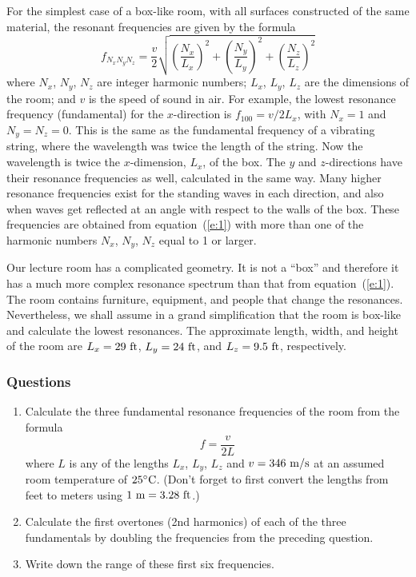 \documentclass[11pt]{NSF}
\def\be{\begin{equation}}
\def\ee{\end{equation}}
\def\ben{\begin{enumerate}}
\def\een{\end{enumerate}}
\begin{document}
For the simplest case of a box-like room, with all surfaces constructed 
of the same material, the resonant frequencies are given by the formula
%
\be
f_{N_xN_yN_z} = \frac{v}{2}\sqrt{
\left(\frac{N_x}{L_x}\right)^2+
\left(\frac{N_y}{L_y}\right)^2+
\left(\frac{N_z}{L_z}\right)^2}
\label{e:1}
\ee
%
where $N_x$, $N_y$, $N_z$ are integer harmonic numbers; $L_x$, $L_y$,
$L_z$ are the dimensions of the room; and $v$ is the speed of sound in
air. For example, the lowest resonance frequency (fundamental) for the
$x$-direction is $f_{100} = v/2L_x$, with $N_x=1$ and $N_y=N_z=0$.
This is the same as the fundamental frequency of a vibrating
string, where the wavelength was twice the length of the string. Now
the wavelength is twice the $x$-dimension, $L_x$, of the box.  The $y$
and $z$-directions have their resonance frequencies as well,
calculated in the same way. Many higher resonance frequencies exist
for the standing waves in each direction, and also when waves get
reflected at an angle with respect to the walls of the box. These
frequencies are obtained from equation~(\ref{e:1}) with more than one of
the harmonic numbers $N_x$, $N_y$, $N_z$ equal to 1 or larger.

Our lecture room has a complicated geometry. It is not a ``box” 
and therefore it has a much more complex resonance spectrum than that from
equation~(\ref{e:1}). The room contains furniture, equipment, and people that
change the resonances. Nevertheless, we shall assume in a grand
simplification that the room is box-like and calculate the lowest
resonances.  
The approximate length, width, and height of the room are 
$L_x=29~{\rm ft}$, $L_y=24~{\rm ft}$, and $L_z=9.5~{\rm ft}$,
respectively.

\subsubsection*{Questions}
\ben
\item
Calculate the three fundamental resonance frequencies of the room
from the formula
%
\be
f= \frac{v}{2L}
\ee
%
where $L$ is any of the lengths $L_x$, $L_y$, $L_z$ and $v = 346~{\rm
m/s}$ at an assumed room temperature of $25{}^\circ{\rm C}$.
(Don't forget to first convert the lengths from feet to meters using
$1~{\rm m}= 3.28~{\rm ft}$.)

\item 
Calculate the first overtones (2nd harmonics) of each of the three
fundamentals by doubling the frequencies from the preceding question.

\item
Write down the range of these first six frequencies.
\een
\end{document}
